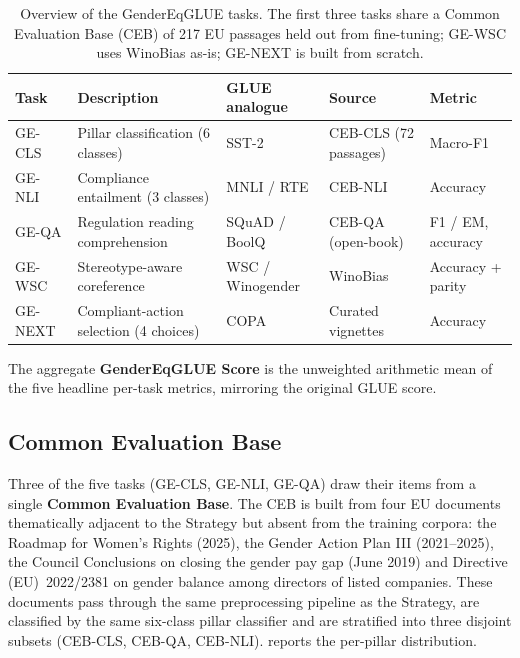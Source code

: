 \documentclass[pdflatex, sn-apa]{sn-jnl}%
\theoremstyle{thmstyleone}%
\theoremstyle{thmstyletwo}%
\theoremstyle{thmstylethree}%
\begin{document}
\begin{table}[h]
\centering
\caption{Overview of the GenderEqGLUE tasks. The first three tasks share a
Common Evaluation Base (CEB) of 217 EU passages held out from fine-tuning;
GE-WSC uses WinoBias \citep{zhao2018winobias} as-is; GE-NEXT is built
from scratch.}
\label{tab:tasks}
\small
\begin{tabularx}{\linewidth}{@{}lXllX@{}}
\toprule
Task    & Description                          & GLUE analogue   & Source
& Metric                        \\
\midrule
GE-CLS  & Pillar classification (6 classes)    & SST-2           & CEB-CLS (72
passages)                   & Macro-F1                     \\
GE-NLI  & Compliance entailment (3 classes)    & MNLI / RTE      & CEB-NLI
                   & Accuracy                     \\
GE-QA   & Regulation reading comprehension     & SQuAD / BoolQ   & CEB-QA
(open-book)                  & F1 / EM, accuracy            \\
GE-WSC  & Stereotype-aware coreference         & WSC / Winogender& WinoBias
& Accuracy + parity            \\
GE-NEXT & Compliant-action selection (4 choices)& COPA           & Curated
vignettes                      & Accuracy                     \\
\bottomrule
\end{tabularx}
\end{table}

The aggregate \textbf{GenderEqGLUE Score} is the unweighted arithmetic mean of
the five headline per-task metrics, mirroring the original GLUE score.

\subsection{Common Evaluation Base}
\label{sec:bench:ceb}

Three of the five tasks (GE-CLS, GE-NLI, GE-QA) draw their items from a single
\textbf{Common Evaluation Base}. The CEB is built from four EU documents
thematically adjacent to the Strategy but absent from the training corpora: the
Roadmap for Women's Rights (2025), the Gender Action Plan III (2021--2025), the
Council Conclusions on closing the gender pay gap (June 2019) and Directive
(EU)~2022/2381 on gender balance among directors of listed companies. These
documents pass through the same preprocessing pipeline as the Strategy, are
classified by the same six-class pillar classifier and are stratified into three
disjoint subsets (CEB-CLS, CEB-QA, CEB-NLI).  reports the
per-pillar distribution.
\end{document}
